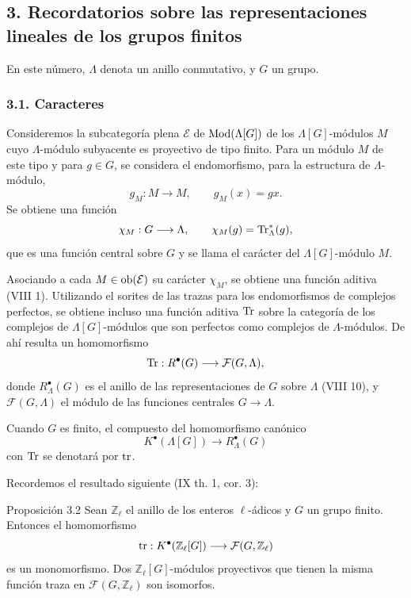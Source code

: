 \subsection*{3. Recordatorios sobre las representaciones lineales de los grupos finitos}

En este número, $\Lambda$ denota un anillo conmutativo, y $G$ un grupo.

\subsubsection*{3.1. Caracteres}

Consideremos la subcategoría plena $\mathcal E$ de $\operatorname{Mod}(\Lambda[G])$ de los $\Lambda[G]$-módulos $M$ cuyo $\Lambda$-módulo subyacente es proyectivo de tipo finito. Para un módulo $M$ de este tipo y para $g\in G$, se considera el endomorfismo, para la estructura de $\Lambda$-módulo,
\[
g_M:M\longrightarrow M,
\qquad g_M(x)=gx.
\]
Se obtiene una función
\[
\chi_M:G\longrightarrow \Lambda,
\qquad \chi_M(g)=\operatorname{Tr}^*_\Lambda(g),
\]
que es una función central sobre $G$ y se llama el carácter del $\Lambda[G]$-módulo $M$.

Asociando a cada $M\in\operatorname{ob}(\mathcal E)$ su carácter $\chi_M$, se obtiene una función aditiva (VIII 1). Utilizando el sorites de las trazas para los endomorfismos de complejos perfectos, se obtiene incluso una función aditiva $\operatorname{Tr}$ sobre la categoría de los complejos de $\Lambda[G]$-módulos que son perfectos como complejos de $\Lambda$-módulos. De ahí resulta un homomorfismo
\[
\operatorname{Tr}:R^{\bullet}(G)\longrightarrow \mathcal F(G,\Lambda),
\]
donde $R^{\bullet}_{\Lambda}(G)$ es el anillo de las representaciones de $G$ sobre $\Lambda$ (VIII 10), y $\mathcal F(G,\Lambda)$ el módulo de las funciones centrales $G\to\Lambda$.

Cuando $G$ es finito, el compuesto del homomorfismo canónico
\[
K^{\bullet}(\Lambda[G])\longrightarrow R^{\bullet}_{\Lambda}(G)
\]
con $\operatorname{Tr}$ se denotará por $\operatorname{tr}$.

Recordemos el resultado siguiente (IX th. 1, cor. 3):

\begin{statement}{Proposición 3.2}
Sean $\mathbb Z_\ell$ el anillo de los enteros $\ell$-ádicos y $G$ un grupo finito. Entonces el homomorfismo
\[
\operatorname{tr}:K^{\bullet}(\mathbb Z_\ell[G])\longrightarrow \mathcal F(G,\mathbb Z_\ell)
\]
es un monomorfismo. Dos $\mathbb Z_\ell[G]$-módulos proyectivos que tienen la misma función traza en $\mathcal F(G,\mathbb Z_\ell)$ son isomorfos.
\end{statement}
